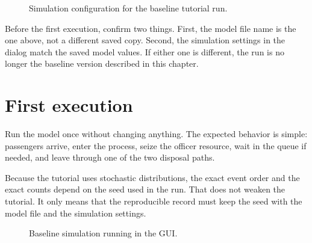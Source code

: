 \begin{figure}[htbp]
\centering
\caption{Simulation configuration for the baseline tutorial run.}
\label{fig:first-model-simulation-config}
\end{figure}

Before the first execution, confirm two things. First, the model file name is
the one above, not a different saved copy. Second, the simulation settings in
the dialog match the saved model values. If either one is different, the run is
no longer the baseline version described in this chapter.

\section{First execution}
\label{sec:first-model-first-execution}

Run the model once without changing anything. The expected behavior is simple:
passengers arrive, enter the process, seize the officer resource, wait in the
queue if needed, and leave through one of the two disposal paths.

Because the tutorial uses stochastic distributions, the exact event order and
the exact counts depend on the seed used in the run. That does not weaken the
tutorial. It only means that the reproducible record must keep the seed with
the model file and the simulation settings.

\begin{figure}[htbp]
\centering
\caption{Baseline simulation running in the GUI.}
\label{fig:first-model-execution}
\end{figure}

